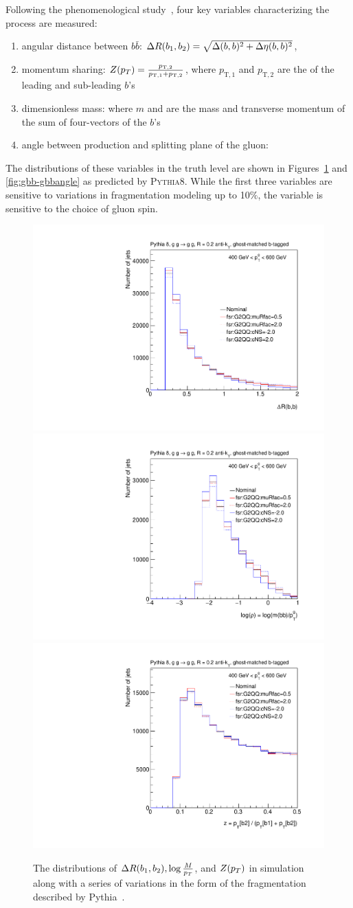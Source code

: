 Following the phenomenological study~\cite{Ilten:2017rbd}, four key variables characterizing the \gbb process are measured:
\begin{enumerate}
\item angular distance between $b\bar b$: ${ \Delta R(b_1, b_2) } = \sqrt{ \Delta(b,b)^2+\Delta \eta(b,b)^2 }$,
\item momentum sharing: $Z(p_T) = \frac{ p_{\text{T},2} }{ p_{\text{T},1}+p_{\text{T},2} }$, where $p_{\text{T},1}$ and $p_{\text{T},2}$ are the \pt of the leading and sub-leading $b$'s
\item dimensionless mass: \mpt where $m$ and \pt are the mass and transverse momentum of the sum of four-vectors of the $b$'s
\item angle between production and splitting plane of the gluon: \dphi
\end{enumerate}

The distributions of these variables in the truth level are shown in Figures~\ref{fig:gbb-gbbdistributions} and \ref{fig:gbb-gbbangle} as predicted by \textsc{Pythia8}. While the first three variables are sensitive to variations in fragmentation modeling up to 10$\%$, the \dphi variable is sensitive to the choice of gluon spin. 



\begin{figure}[htpb!]
\begin{center}
\includegraphics[width=0.33\linewidth]{figures/gbb/truth_level/DeltaRbb.pdf}\includegraphics[width=0.33\linewidth]{figures/gbb/truth_level/rhobb.pdf}\includegraphics[width=0.33\linewidth]{figures/gbb/truth_level/DeltaZbb.pdf}
\caption{The distributions of ${ \Delta R(b_1, b_2) }, \log{\frac{M}{p_T}}$, and $Z(p_T)$ in simulation along with a series of variations in the form of the fragmentation described by Pythia~\cite{pythiavariations}.} 
\label{fig:gbb-gbbdistributions}
\end{center}
\end{figure}

